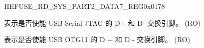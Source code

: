 \begin{register}{H}{EFUSE\_RD\_SYS\_PART2\_DATA7\_REG}{0x0178}\label{regdesc:EFUSERDSYSPART2DATA7REG}
%
%
%
%
\regnewline%
\begin{regdesc}\begin{reglist}
\label{fielddesc:EFUSEUSBDEVICEEXCHGPINS}\item [EFUSE\_USB\_DEVICE\_EXCHG\_PINS] 表示是否使能 USB-Serial-JTAG 的 D+ 和 D- 交换引脚。 (RO)
\label{fielddesc:EFUSEUSBOTG11EXCHGPINS}\item [EFUSE\_USB\_OTG11\_EXCHG\_PINS] 表示是否使能 USB OTG11 的 D + 和 D - 交换引脚。 (RO)
\end{reglist}\end{regdesc}
\end{register}


